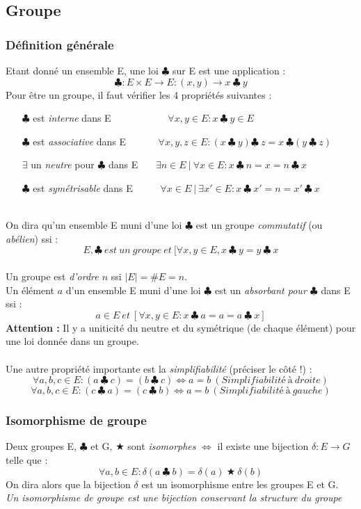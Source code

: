 \documentclass[12pt, a4paper]{article}
\begin{document}
\subsection{Groupe}
\subsubsection{Définition générale}
Etant donné un ensemble E, une loi $\clubsuit$ sur E est une application :
$$\clubsuit: E \times E \rightarrow E : (x,y) \rightarrow x\ \clubsuit\ y$$
Pour être un groupe, il faut vérifier les 4 propriétés suivantes : 
\begin{itemize}
\item[$\clubsuit$ est \textit{interne} dans E] \ \ \ \ \ \ \ \ \ \  \ $\forall x, y \in E : x\ \clubsuit\ y \in E$
\item[$\clubsuit$ est \textit{associative} dans E]\ \ \ \ \ \ $\forall x, y, z \in E : (x\ \clubsuit\ y)\clubsuit\ z =  x\ \clubsuit(y\ \clubsuit\ z)$
\item[$\exists$ un \textit{neutre} pour $\clubsuit$ dans E] \ \ \  $\exists n \in E\ |\ \forall x \in E : x\ \clubsuit\ n = x = n\ \clubsuit\ x$
\item[$\clubsuit$ est \textit{symétrisable} dans E]\ \ \ \ \ $\forall x \in E\ |\ \exists x' \in E : x\ \clubsuit\ x' = n = x'\ \clubsuit\ x$
\end{itemize}
\ \\
On dira qu'un ensemble E muni d'une loi $\clubsuit$ est un groupe \textit{commutatif} (ou \textit{abélien}) ssi :
$$E, \clubsuit\ est\ un\ groupe\ et\ [\forall x, y \in E, x\ \clubsuit\ y = y\ \clubsuit\ x$$
\ \\
Un groupe est \textit{d'ordre $n$} ssi $|E| = \#E = n$.\\
Un élément $a$ d'un ensemble E muni d'une loi $\clubsuit$ est un \textit{absorbant pour $\clubsuit$} dans E ssi :
$$a \in E\ et\ [\forall x, y \in E : x\ \clubsuit\ a = a = a\ \clubsuit\ x]$$
\textbf{Attention :} Il y a uniticité du neutre et du symétrique (de chaque élément) pour une loi donnée dans un groupe.\\ \\
Une autre propriété importante est la \textit{simplifiabilité} (préciser le côté !) :
$$\forall a, b, c \in E : (a\ \clubsuit\ c) = (b\ \clubsuit\ c) \Leftrightarrow a = b\ (Simplifiabilité\ à\ droite)$$
$$\forall a, b, c \in E : (c\ \clubsuit\ a) = (c\ \clubsuit\ b) \Leftrightarrow a = b\ (Simplifiabilité\ à\ gauche)$$

\subsubsection{Isomorphisme de groupe}
Deux groupes E, $\clubsuit$ et G, $\bigstar$ sont \textit{isomorphes} $\Leftrightarrow$ il existe une bijection $\delta : E \rightarrow G$ telle que : 
$$\forall a, b \in E : \delta (a\ \clubsuit\ b) = \delta(a)\ \bigstar\ \delta(b)$$
On dira alors que la bijection $\delta$ est un isomorphisme entre les groupes E et G.\\
\textit{Un isomorphisme de groupe est une bijection conservant la structure du groupe}
\end{document}
